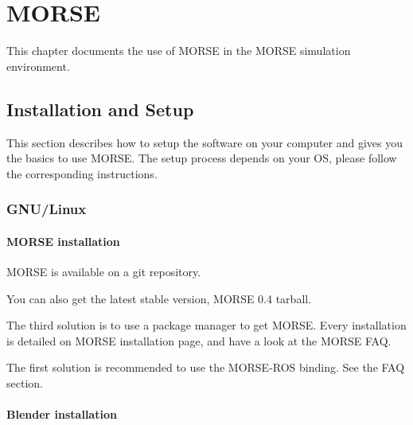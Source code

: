 
\chapter{MORSE}
\label{sec:morse}

This chapter documents the use of MORSE in the MORSE simulation
environment.

\section{Installation and Setup}

This section describes how to setup the software on your computer and gives
you the basics to use MORSE.  The setup process depends on your OS, please
follow the corresponding instructions.

\subsection{GNU/Linux}

\subsubsection{MORSE installation}

MORSE is available on a git repository.


You can also get the latest stable version,
 {MORSE 0.4 tarball}.

The third solution is to use a package manager to get MORSE.  Every
installation is detailed on
{MORSE installation page}, and have a look at the
 {MORSE FAQ}.

The first solution is recommended to use the MORSE-ROS binding. See the FAQ
section. %

\subsubsection{Blender installation}


